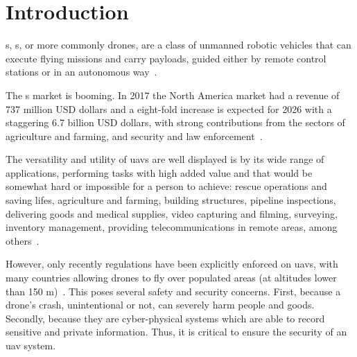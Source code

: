 
%

%

\chapter{Introduction}%
\label{cha:introduction}
s, s, or more commonly drones, are a class of
unmanned robotic vehicles that can execute flying missions and carry payloads,
guided either by remote control stations or in an autonomous
way~\cite{alladi2022UAVBlockain,glossner2021overview}.

The s market is booming. In 2017 the North America market had a revenue of
737 million USD dollars and a eight-fold increase is expected for 2026 with a
staggering 6.7 billion USD dollars, with strong contributions from the sectors
of agriculture and farming, and security and law
enforcement~\cite{mohsan2022towards}.

The versatility and utility of \glspl{uav} are well displayed is by its wide
range of applications, performing tasks with high added value and that would be
somewhat hard or impossible for a person to achieve: rescue operations and
saving lifes, agriculture and farming, building structures, pipeline
inspections, delivering goods and medical supplies, video capturing and filming,
surveying, inventory management, providing telecommunications in remote areas,
among others~\cite{alladi2022UAVBlockain}.

However, only recently regulations have been explicitly enforced on \glspl{uav},
with many countries allowing drones to fly over populated areas (at altitudes
lower than 150 m)~\cite{nassi2021sok}. This poses several safety and security
concerns. First, because a drone's crash, unintentional or not, can severely
harm people and goods. Secondly, because they are cyber-physical systems which
are able to record sensitive and private information. Thus,
it is critical to ensure the security of an \gls{uav} system.

